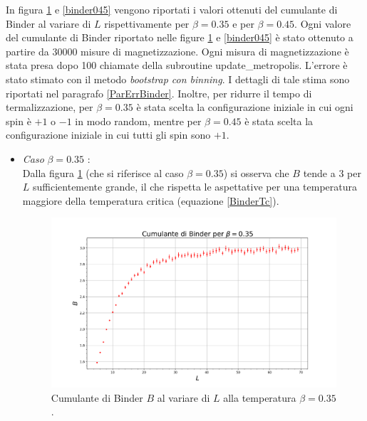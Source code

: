 \documentclass[10pt,a4paper]{article}
\begin{document}
In figura \ref{binder035} e \ref{binder045} vengono riportati i valori ottenuti del cumulante di Binder al variare di $L$ rispettivamente per $\beta=0.35$ e per $\beta=0.45$. Ogni valore del cumulante di Binder riportato nelle figure \ref{binder035} e \ref{binder045} è stato ottenuto a partire da $30000$ misure di magnetizzazione. Ogni misura di magnetizzazione è stata presa dopo 100 chiamate della subroutine update\_metropolis. L'errore è stato stimato con il metodo \emph{bootstrap con binning}. I dettagli di tale stima sono riportati nel paragrafo \ref{ParErrBinder}. Inoltre, per ridurre il tempo di termalizzazione, per $\beta=0.35$ è stata scelta la configurazione iniziale in cui ogni spin è $+1$ o $-1$ in modo random, mentre per $\beta=0.45$ è stata scelta la configurazione iniziale in cui tutti gli spin sono $+1$.
\begin{itemize}
	\item \emph{Caso} $\beta=0.35$ :\\
	Dalla figura \ref{binder035} (che si riferisce al caso $\beta=0.35$) si osserva che $B$ tende a $3$ per $L$ sufficientemente grande, il che rispetta le aspettative per una temperatura maggiore della temperatura critica (equazione \ref{BinderTc}). 
	\begin{figure}[h!]%
		\centering
		\includegraphics[width=1\linewidth]{binder035}
		\caption{Cumulante di Binder $B$ al variare di $L$ alla temperatura $\beta=0.35$.}
		\label{binder035}
	\end{figure}



\end{itemize}
\end{document}
